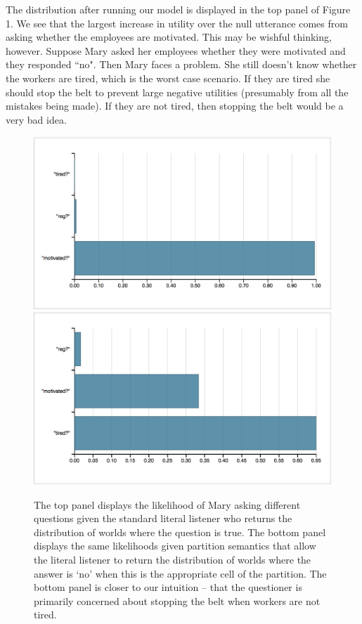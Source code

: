 \documentclass[12pt]{amsart}
\begin{document}
The distribution after running our model is displayed in the top panel of Figure 1. We see that the largest increase in utility over the null utterance comes from asking whether the employees are motivated. This may be wishful thinking, however. Suppose Mary asked her employees whether they were motivated and they responded ``no". Then Mary faces a problem. She still doesn't know whether the workers are tired, which is the worst case scenario. If they are tired she should stop the belt to prevent large negative utilities (presumably from all the mistakes being made). If they are not tired, then stopping the belt would be a very bad idea.

\begin{figure}[t]
\includegraphics[scale=.71]{only_yes_dist.png}
\includegraphics[scale=.71]{full_polar_dist.png}
\caption{The top panel displays the likelihood of Mary asking different questions given the standard literal listener who returns the distribution of worlds where the question is true. The bottom panel displays the same likelihoods given partition semantics that allow the literal listener to return the distribution of worlds where the answer is `no' when this is the appropriate cell of the partition. The bottom panel is closer to our intuition -- that the questioner is primarily concerned about stopping the belt when workers are not tired.}
\end{figure}
\end{document}
